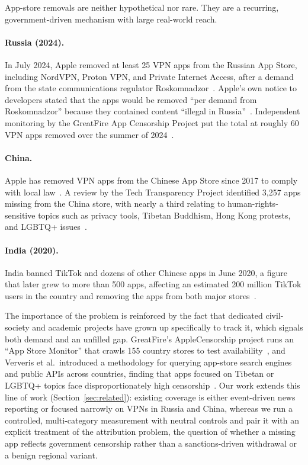 App-store removals are neither hypothetical nor rare. They are a recurring,
government-driven mechanism with large real-world reach.

\paragraph{Russia (2024).} In July 2024, Apple removed at least 25 VPN apps from
the Russian App Store, including NordVPN, Proton VPN, and Private Internet Access,
after a demand from the state communications regulator
Roskomnadzor~\cite{techcrunch2024russia}. Apple's own notice to developers stated
that the apps would be removed ``per demand from Roskomnadzor'' because they
contained content ``illegal in Russia''~\cite{moscowtimes2024russia}. Independent
monitoring by the GreatFire App Censorship Project put the total at roughly 60
VPN apps removed over the summer of 2024~\cite{applecensorship}.

\paragraph{China.} Apple has removed VPN apps from the Chinese App Store since
2017 to comply with local law~\cite{cnbc2017china}. A review by the Tech
Transparency Project identified 3{,}257 apps missing from the China store, with
nearly a third relating to human-rights-sensitive topics such as privacy tools,
Tibetan Buddhism, Hong Kong protests, and LGBTQ+
issues~\cite{ttp2021china}.

\paragraph{India (2020).} India banned TikTok and dozens of other Chinese apps in
June 2020, a figure that later grew to more than 500 apps, affecting an estimated
200 million TikTok users in the country and removing the apps from both major
stores~\cite{techcrunch2020india}.

The importance of the problem is reinforced by the fact that dedicated
civil-society and academic projects have grown up specifically to track it, which
signals both demand and an unfilled gap. GreatFire's AppleCensorship project runs
an ``App Store Monitor'' that crawls 155 country stores to test
availability~\cite{applecensorship}, and Ververis et al.\ introduced a
methodology for querying app-store search engines and public APIs across
countries, finding that apps focused on Tibetan or LGBTQ+ topics face
disproportionately high censorship~\cite{ververis2019shedding}. Our work extends
this line of work (Section~\ref{sec:related}): existing coverage is either
event-driven news reporting or focused narrowly on VPNs in Russia and China,
whereas we run a controlled, multi-category measurement with neutral controls and
pair it with an explicit treatment of the attribution problem, the question of
whether a missing app reflects government censorship rather than a sanctions-driven
withdrawal or a benign regional variant.

